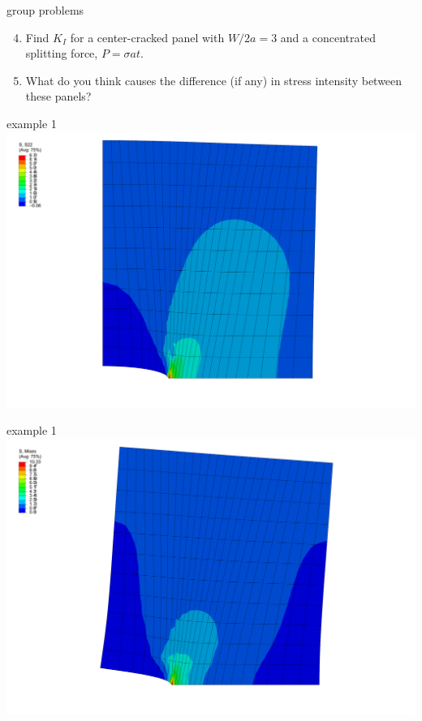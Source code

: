 \documentclass[
  letterpaper,
  ignorenonframetext,
  aspectratio=43,
  handout,
  12pt]{beamer}
\let\Oldincludegraphics\includegraphics
\renewcommand{\includegraphics}[2][]{\Oldincludegraphics[width=\textwidth,height=0.7\textheight,keepaspectratio]{#2}}
\begin{document}
\begin{frame}{group problems}
\protect\hypertarget{group-problems-1}{}
\begin{enumerate}
\setcounter{enumi}{3}
\item
  Find \(K_I\) for a center-cracked panel with \(W/2a = 3\) and a
  concentrated splitting force, \(P = \sigma a t\).
\item
  What do you think causes the difference (if any) in stress intensity
  between these panels?
\end{enumerate}
\end{frame}

\begin{frame}{example 1}
\protect\hypertarget{example-1}{}
\includegraphics{../images/center-crack.png}
\end{frame}

\begin{frame}{example 1}
\protect\hypertarget{example-1-1}{}
\includegraphics{../images/edge-crack.png}
\end{frame}
\end{document}
